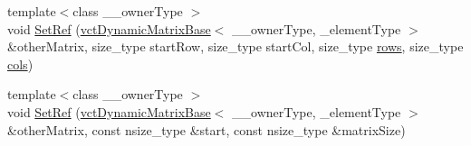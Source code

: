{\bf }\par
\begin{DoxyCompactItemize}
\item 
{\footnotesize template$<$class \-\_\-\-\_\-owner\-Type $>$ }\\void \hyperlink{classvct_dynamic_matrix_ref_a1f6116eb9c7d353626fee6a5fc7c76b3}{Set\-Ref} (\hyperlink{classvct_dynamic_matrix_base}{vct\-Dynamic\-Matrix\-Base}$<$ \-\_\-\-\_\-owner\-Type, \-\_\-element\-Type $>$ \&other\-Matrix, size\-\_\-type start\-Row, size\-\_\-type start\-Col, size\-\_\-type \hyperlink{classvct_dynamic_const_matrix_base_a5eac13be2207ebeb8766cde379d73438}{rows}, size\-\_\-type \hyperlink{classvct_dynamic_const_matrix_base_aa6c51d41a100da49a7e7ac7edb20ecd9}{cols})
\item 
{\footnotesize template$<$class \-\_\-\-\_\-owner\-Type $>$ }\\void \hyperlink{classvct_dynamic_matrix_ref_a372cf1c8daf6229ac1d8716a3402b617}{Set\-Ref} (\hyperlink{classvct_dynamic_matrix_base}{vct\-Dynamic\-Matrix\-Base}$<$ \-\_\-\-\_\-owner\-Type, \-\_\-element\-Type $>$ \&other\-Matrix, const nsize\-\_\-type \&start, const nsize\-\_\-type \&matrix\-Size)
\end{DoxyCompactItemize}

